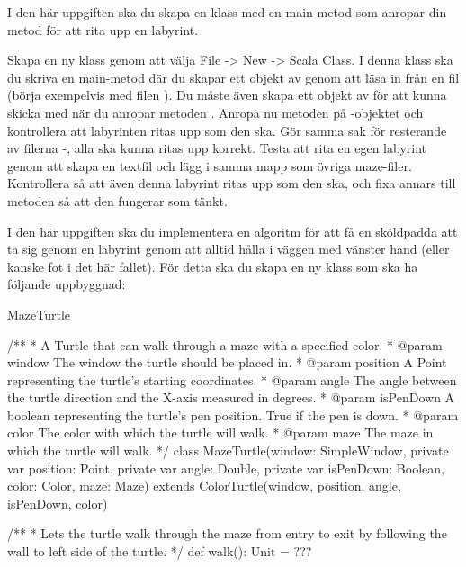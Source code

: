 \Task I den här uppgiften ska du skapa en klass med en main-metod som anropar din metod för att rita upp en labyrint.

\Subtask Skapa en ny klass  genom att välja File -> New -> Scala Class. I denna klass ska du skriva en main-metod där du skapar ett objekt av  genom att läsa in från en fil (börja exempelvis med filen ). Du måste även skapa ett objekt av  för att kunna skicka med när du anropar metoden . Anropa nu metoden  på -objektet och kontrollera att labyrinten ritas upp som den ska. Gör samma sak för resterande av filerna -, alla ska kunna ritas upp korrekt. Testa att rita en egen labyrint genom att skapa en textfil  och lägg i samma mapp som övriga maze-filer. Kontrollera så att även denna labyrint ritas upp som den ska, och fixa annars till metoden  så att den fungerar som tänkt.


\Task I den här uppgiften ska du implementera en algoritm för att få en sköldpadda att ta sig genom en labyrint genom att alltid hålla i väggen med vänster hand (eller kanske fot i det här fallet). För detta ska du skapa en ny klass  som ska ha följande uppbyggnad:


\begin{ScalaSpec}{MazeTurtle}

/**
 * A Turtle that can walk through a maze with a specified color.
 * @param window     The window the turtle should be placed in.
 * @param position   A Point representing the turtle's starting coordinates.
 * @param angle      The angle between the turtle direction and the X-axis measured in degrees.
 * @param isPenDown  A boolean representing the turtle's pen position. True if the pen is down.
 * @param color		   The color with which the turtle will walk.
 * @param maze	     The maze in which the turtle will walk.
 */
class MazeTurtle(window: SimpleWindow, private var position: Point, private var angle: Double, private var isPenDown: Boolean, color: Color, maze: Maze) extends ColorTurtle(window, position, angle, isPenDown, color) {

  /**
   * Lets the turtle walk through the maze from entry to exit by following the wall to left side of the turtle.
   */
  def walk(): Unit = ???

}

\end{ScalaSpec}

